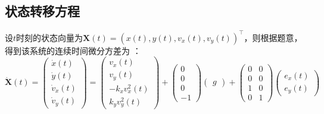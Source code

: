 \documentclass[12pt, onecolumn]{article}
\title{\normf{编程：观测值逐次更新的扩展卡尔曼滤波器}}
\author{\normf 姓名：陈烁龙\;\;\;学号：2023202140019\;\;\;学院：测绘学院}
\date{\normf{\today}}
\newcommand\normf{\fangsong}
\begin{document}
	
		\maketitle
		\thispagestyle{empty}
		\clearpage
		
		\tableofcontents
		\newpage
		\listoffigures
		\newpage
		\listoftables
		
		\clearpage
		\setcounter{page}{1}
	
	\section{\normf{问题分析}}
	\normf
	\subsection{\normf 状态转移方程}
	设$t$时刻的状态向量为$\boldsymbol{X}(t)=\left( x(t),y(t),v_x(t),v_y(t)\right) ^\top$，则根据题意，得到该系统的连续时间微分方差为
	：
	\begin{equation}
	\dot{\boldsymbol{X}}(t)=\begin{pmatrix}
	\dot{x}(t)\\\dot{y}(t)\\\dot{v}_x(t)\\\dot{v}_y(t)
	\end{pmatrix}=\begin{pmatrix}
	v_x(t)\\
	v_y(t)\\
	-k_x v^2_x(t)\\
	k_y v^2_y(t)
	\end{pmatrix}+\begin{pmatrix}
	0\\0\\0\\-1
	\end{pmatrix}\begin{pmatrix}
	g
	\end{pmatrix}+\begin{pmatrix}
	0&0\\
	0&0\\
	1&0\\
	0&1
	\end{pmatrix}\begin{pmatrix}
	e_x(t)\\
	e_y(t)
	\end{pmatrix}
	\end{equation}
\end{document}
